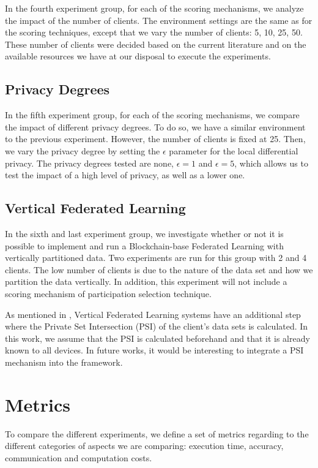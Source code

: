 In the fourth experiment group, for each of the scoring mechanisms, we analyze the impact of the number of clients. The environment settings are the same as for the scoring techniques, except that we vary the number of clients: 5, 10, 25, 50. These number of clients were decided based on the current literature and on the available resources we have at our disposal to execute the experiments.

\subsection{Privacy Degrees}

In the fifth experiment group, for each of the scoring mechanisms, we compare the impact of different privacy degrees. To do so, we have a similar environment to the previous experiment. However, the number of clients is fixed at 25. Then, we vary the privacy degree by setting the $\epsilon$ parameter for the local differential privacy. The privacy degrees tested are none, $\epsilon = 1$ and $\epsilon = 5$, which allows us to test the impact of a high level of privacy, as well as a lower one.

\subsection{Vertical Federated Learning}

In the sixth and last experiment group, we investigate whether or not it is possible to implement and run a Blockchain-base Federated Learning with vertically partitioned data. Two experiments are run for this group with 2 and 4 clients. The low number of clients is due to the nature of the data set and how we partition the data vertically. In addition, this experiment will not include a scoring mechanism of participation selection technique.

As mentioned in , Vertical Federated Learning systems have an additional step where the Private Set Intersection (PSI) of the client's data sets is calculated. In this work, we assume that the PSI is calculated beforehand and that it is already known to all devices. In future works, it would be interesting to integrate a PSI mechanism into the framework.

\section{Metrics}\label{meth:metrics}

To compare the different experiments, we define a set of metrics regarding to the different categories of aspects we are comparing: execution time, accuracy, communication and computation costs.

